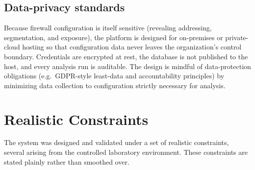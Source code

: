 \documentclass[12pt,a4paper]{report}
\renewcommand{\_}{\textunderscore\allowbreak}
\begin{document}
\subsection{Data-privacy standards}
Because firewall configuration is itself sensitive (revealing addressing, segmentation, and exposure), the platform is designed for on-premises or private-cloud hosting so that configuration data never leaves the organization's control boundary. Credentials are encrypted at rest, the database is not published to the host, and every analysis run is auditable. The design is mindful of data-protection obligations (e.g.\ GDPR-style least-data and accountability principles) by minimizing data collection to configuration strictly necessary for analysis.

\section{Realistic Constraints}
\label{sec:ch1-constraints}

The system was designed and validated under a set of realistic constraints, several arising from the controlled laboratory environment. These constraints are stated plainly rather than smoothed over.
\end{document}
